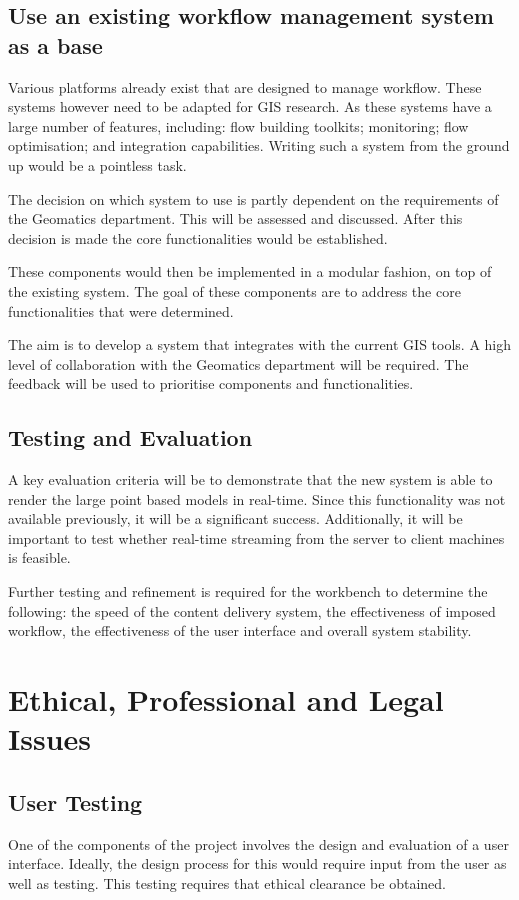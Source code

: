 \documentclass[12pt,a4paper]{article}
\begin{document}
\subsection{Use an existing workflow management system as a base}
Various platforms already exist that are designed to manage workflow. These
systems however need to be adapted for GIS research. As these systems have
a large number of features, including: flow building toolkits; monitoring;
flow optimisation; and integration capabilities. Writing such a system
from the ground up would be a pointless task.

The decision on which system to use is partly dependent on the requirements
of the Geomatics department. This will be assessed and discussed. After
this decision is made the core functionalities would be established.

These components would then be implemented in a modular fashion, on top of
the existing system. The goal of these components are to address the core
functionalities that were determined.

The aim is to develop a system that integrates with  the current GIS
tools. A high level of collaboration with the Geomatics department will
be required. The feedback will be used to prioritise components and
functionalities.


\subsection{Testing and Evaluation}
A key evaluation criteria will be to demonstrate that the new
system is able to render the large point based models in real-time. Since this
functionality was not available previously, it will be a significant success.
Additionally, it will be important to test whether real-time streaming from the
server to client machines is feasible.

Further testing and refinement is required for the workbench
to determine the  following: the speed of the content
delivery system, the effectiveness of imposed workflow, the
effectiveness of the user interface and overall system stability.

\section{Ethical, Professional and Legal Issues}
\subsection{User Testing}
One of the components of the project involves the design and evaluation
of a user interface. Ideally, the design process for this would require
input from the user as well as testing. This testing requires that ethical clearance
be obtained.
\end{document}
